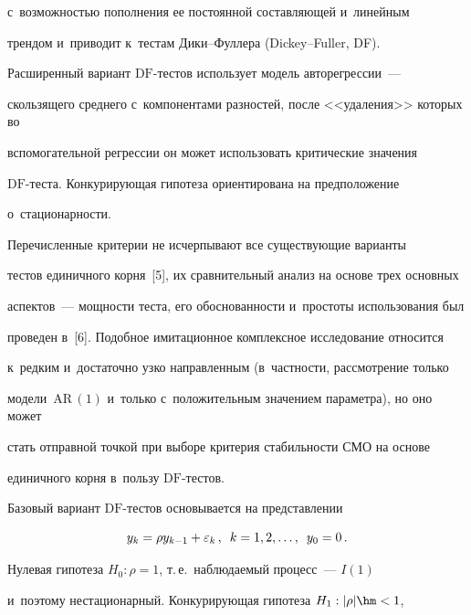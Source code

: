 с~воз\-мож\-ностью пополнения ее постоянной составляющей и~линейным 


трендом и~приводит к~тестам Ди\-ки--Фул\-ле\-ра (Dickey--Fuller, DF). 


Расширенный вариант $\mathrm{DF}$-тес\-тов использует модель авторегрессии~--- 


скользящего среднего с~компонентами разностей, после <<удаления>> которых во 


вспомогательной регрессии он может использовать критические значения  


$\mathrm{DF}$-тес\-та. Кон\-ку\-ри\-ру\-ющая гипотеза ориентирована на предположение 


о~ста\-ци\-о\-нар\-ности.


     


     Перечисленные критерии не исчерпывают все существующие варианты 


тес\-тов единичного корня~[5], их сравнительный анализ на основе трех основных 


аспектов~--- мощ\-ности тес\-та, его обосно\-ван\-ности и~прос\-то\-ты использования был 


проведен в~[6]. Подобное имитационное комплексное исследование относится 


к~редким и~достаточно узко направленным (в~частности, рассмотрение только 


модели~$\mathrm{AR}\,(1)$ и~только с~положительным значением па\-ра\-мет\-ра), но оно может 


стать отправной точ\-кой при выборе критерия стабильности СМО на осно\-ве 


единичного корня в~пользу $\mathrm{DF}$-тес\-тов. 


     


     Базовый вариант $\mathrm{DF}$-тестов основывается на представлении


     \begin{equation}


     y_k=\rho y_{k-1}+\varepsilon_k\,,\enskip k=1,2,\ldots, \enskip y_0=0\,.


     \label{e1-kri}


     \end{equation}


Нулевая гипотеза $H_0: \rho =1$, т.\,е.\ наблюдаемый процесс~--- $I(1)$ 


и~поэтому нестационарный. Конкурирующая гипотеза $H_1: \vert\rho\vert \hm<1$, 


